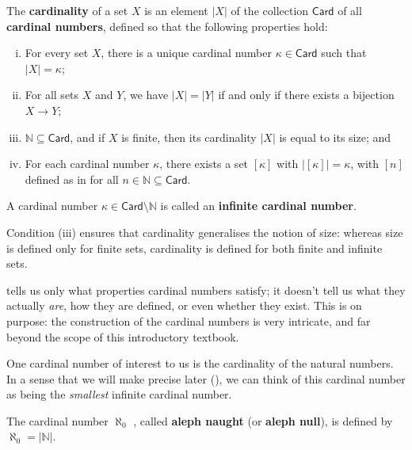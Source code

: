 \begin{definition}
\label{defCardinality}
The \textbf{cardinality} of a set $X$ is an element $|X|$ of the collection $\mathsf{Card}$  of all \textbf{cardinal numbers}, defined so that the following properties hold:
\begin{enumerate}[(i)]
\item For every set $X$, there is a unique cardinal number $\kappa \in \mathsf{Card}$ such that $|X| = \kappa$;
\item For all sets $X$ and $Y$, we have $|X| = |Y|$ if and only if there exists a bijection $X \to Y$;
\item $\mathbb{N} \subseteq \mathsf{Card}$, and if $X$ is finite, then its cardinality $|X|$ is equal to its size; and
\item For each cardinal number $\kappa$, there exists a set $[\kappa]$ with $|[\kappa]| = \kappa$, with $[n]$ defined as in  for all $n \in \mathbb{N} \subseteq \mathsf{Card}$.
\end{enumerate}
A cardinal number $\kappa \in \mathsf{Card} \setminus \mathbb{N}$ is called an \textbf{infinite cardinal number}.
\end{definition}

Condition (iii) ensures that cardinality generalises the notion of size: whereas size is defined only for finite sets, cardinality is defined for both finite and infinite sets.

 tells us only what properties cardinal numbers satisfy; it doesn't tell us what they actually \textit{are}, how they are defined, or even whether they exist. This is on purpose: the construction of the cardinal numbers is very intricate, and far beyond the scope of this introductory textbook.

One cardinal number of interest to us is the cardinality of the natural numbers. In a sense that we will make precise later (), we can think of this cardinal number as being the \textit{smallest} infinite cardinal number.

\begin{definition}
\label{defAlephNaught}
The cardinal number $\aleph_0$ , called \textbf{aleph naught} (or \textbf{aleph null}), is defined by $\aleph_0 = |\mathbb{N}|$.
\end{definition}

